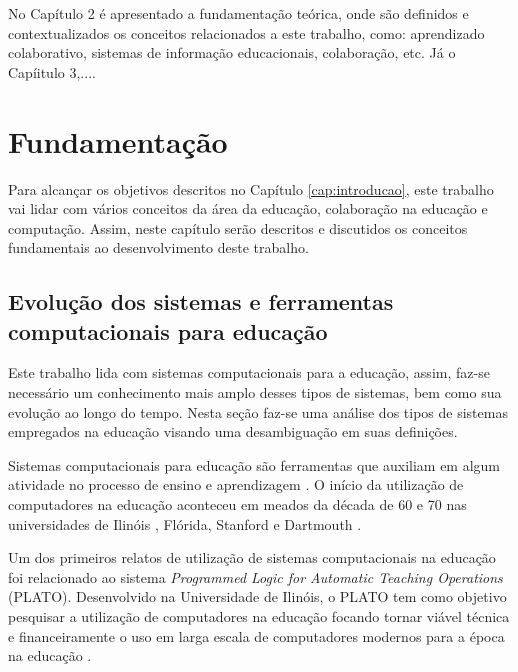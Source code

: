 No Capítulo 2 é apresentado a fundamentação teórica, onde são definidos e contextualizados os conceitos relacionados a este trabalho, como: aprendizado colaborativo, sistemas de informação educacionais, colaboração, etc. Já o Capíitulo 3,....

\fi

\chapter{Fundamentação}
\label{cap:fundamentacao}

Para alcançar os objetivos descritos no Capítulo \ref{cap:introducao}, este trabalho vai lidar com vários conceitos da área da educação, colaboração na educação e computação. Assim, neste capítulo serão descritos e discutidos os conceitos fundamentais ao desenvolvimento deste trabalho.

\section{Evolução dos sistemas e ferramentas computacionais para educação}



Este trabalho lida com sistemas computacionais para a educação, assim, faz-se necessário um conhecimento mais amplo desses tipos de sistemas, bem como sua evolução ao longo do tempo. Nesta seção faz-se uma análise dos tipos de sistemas empregados na educação visando uma desambiguação em suas definições.

Sistemas computacionais para educação são ferramentas que auxiliam em algum atividade no processo de ensino e aprendizagem \cite{tchounikine11}. O início da utilização de computadores na educação aconteceu em meados da década de 60 e 70 nas universidades de Ilinóis \cite{plato}, Flórida, Stanford e Dartmouth \cite{chambers80}.

Um dos primeiros relatos de utilização de sistemas computacionais na educação foi relacionado ao sistema \emph{Programmed Logic for Automatic Teaching Operations} (PLATO). Desenvolvido na Universidade de Ilinóis, o PLATO tem como objetivo pesquisar a utilização de computadores na educação focando tornar viável técnica e financeiramente o uso em larga escala de computadores modernos para a época na educação \cite{plato}.

